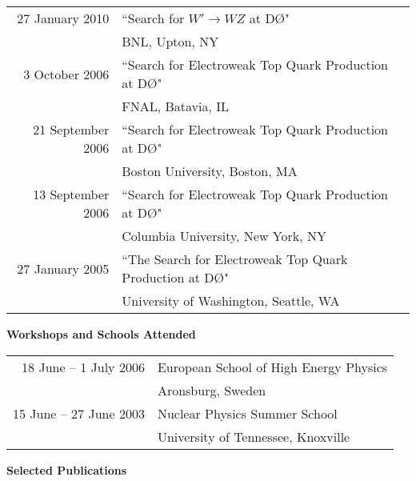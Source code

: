 \documentclass[12pt]{article}
\newcommand{\dzero}{D\O}
\begin{document}
\begin{tabular}{rl}
27 January 2010	&	``Search for $W'\rightarrow WZ$ at \dzero"\\
				&	BNL, Upton, NY	\\
3 October 2006		&	``Search for Electroweak Top Quark Production at \dzero"\\
				&	FNAL, Batavia, IL	\\
21 September 2006	&	``Search for Electroweak Top Quark Production at \dzero"\\
				&	Boston University, Boston, MA	\\
13 September 2006	&	``Search for Electroweak Top Quark Production at \dzero"\\
				&	Columbia University, New York, NY	\\
27 January 2005	&	``The Search for Electroweak Top Quark Production at \dzero" \\
				&	University of Washington, Seattle, WA \\
\end{tabular}




\noindent
{\Large \textbf{Workshops and Schools Attended}}

\begin{tabular}{rl}
18 June -- 1 July 2006	&	European School of High Energy Physics \\
					&	Aronsburg, Sweden \\
15 June -- 27 June 2003	&	Nuclear Physics Summer School \\
					&	University of Tennessee, Knoxville \\
\end{tabular}

\newpage


\noindent
{\Large \textbf{Selected Publications}}
\end{document}

